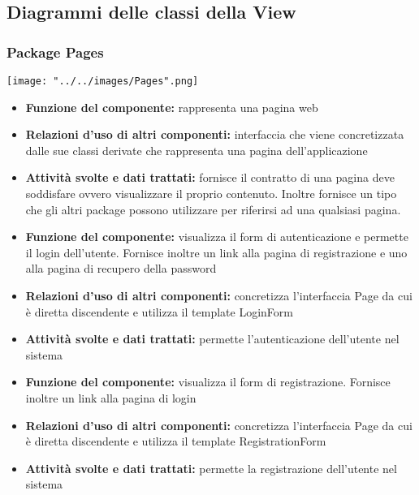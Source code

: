 \subsection{Diagrammi delle classi della View}	
		
	\subsubsection{Package Pages}
		\begin{center}
			\centerline{\texttt{[image: "../../images/Pages".png]}}
		\end{center}
			\begin{itemize}
		    		\item\textbf{Funzione del componente:} rappresenta una pagina web
				\item\textbf{Relazioni d'uso di altri componenti:} interfaccia che viene concretizzata dalle sue classi derivate che rappresenta una pagina dell'applicazione
				\item\textbf{Attività svolte e dati trattati:} fornisce il contratto di una pagina deve soddisfare ovvero visualizzare il proprio contenuto. Inoltre fornisce un tipo che gli altri package possono utilizzare per riferirsi ad una qualsiasi pagina.
			\end{itemize}
			\begin{itemize}
		    		\item\textbf{Funzione del componente:} visualizza il form di autenticazione e permette il login dell'utente. Fornisce inoltre un link alla pagina di registrazione e uno alla pagina di recupero della password 
				\item\textbf{Relazioni d'uso di altri componenti:} concretizza l'interfaccia Page da cui è diretta discendente e utilizza il template LoginForm
				\item\textbf{Attività svolte e dati trattati:} permette l'autenticazione dell'utente nel sistema
			\end{itemize}
			\begin{itemize}
		    		\item\textbf{Funzione del componente:} visualizza il form di registrazione. Fornisce inoltre un link alla pagina di login
				\item\textbf{Relazioni d'uso di altri componenti:} concretizza l'interfaccia Page da cui è diretta discendente e utilizza il template RegistrationForm
				\item\textbf{Attività svolte e dati trattati:} permette la registrazione dell'utente nel sistema
			\end{itemize}
